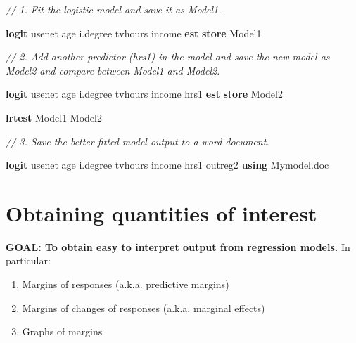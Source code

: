 \documentclass[
]{book}
\newenvironment{Shaded}{\begin{snugshade}}{\end{snugshade}}
\newcommand{\CommentTok}[1]{\textcolor[rgb]{0.56,0.35,0.01}{\textit{#1}}}
\newcommand{\KeywordTok}[1]{\textcolor[rgb]{0.13,0.29,0.53}{\textbf{#1}}}
\newcommand{\NormalTok}[1]{#1}
\providecommand{\tightlist}{%
  \setlength{\itemsep}{0pt}\setlength{\parskip}{0pt}}
\begin{document}
\begin{alert}

\begin{Shaded}
\begin{Highlighting}[]
\CommentTok{// 1.  Fit the logistic model and save it as \textasciigrave{}Model1\textasciigrave{}.  }

\KeywordTok{logit}\NormalTok{ usenet age i.degree tvhours income }
\KeywordTok{est} \KeywordTok{store}\NormalTok{ Model1}

\CommentTok{// 2.  Add another predictor (\textasciigrave{}hrs1\textasciigrave{}) in the model and save the new model as \textasciigrave{}Model2\textasciigrave{} and compare between \textasciigrave{}Model1\textasciigrave{} and \textasciigrave{}Model2\textasciigrave{}. }

\KeywordTok{logit}\NormalTok{ usenet age i.degree tvhours income hrs1}
\KeywordTok{est} \KeywordTok{store}\NormalTok{ Model2 }

\KeywordTok{lrtest}\NormalTok{ Model1 Model2}

\CommentTok{// 3.  Save the better fitted model output to a word document. }

\KeywordTok{logit}\NormalTok{ usenet age i.degree tvhours income hrs1}
\NormalTok{outreg2 }\KeywordTok{using}\NormalTok{ Mymodel.doc}
\end{Highlighting}
\end{Shaded}

\end{alert}

\hypertarget{obtaining-quantities-of-interest}{%
\section{Obtaining quantities of interest}\label{obtaining-quantities-of-interest}}

\begin{alert}

\textbf{GOAL: To obtain easy to interpret output from regression models.} In particular:

\begin{enumerate}
\def\labelenumi{\arabic{enumi}.}
\tightlist
\item
  Margins of responses (a.k.a. predictive margins)
\item
  Margins of changes of responses (a.k.a. marginal effects)
\item
  Graphs of margins
\end{enumerate}

\end{alert}
\end{document}
